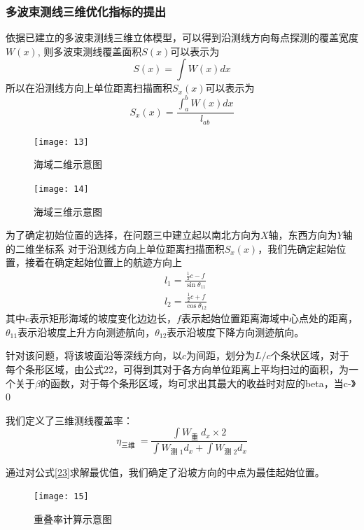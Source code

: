 \documentclass[11pt,twoside,a4paper]{article}
\begin{document}
\subsubsection{多波束测线三维优化指标的提出}
依据已建立的多波束测线三维立体模型，可以得到沿测线方向每点探测的覆盖宽度$W(x)$, 则多波束测线覆盖面积$S(x)$可以表示为
\begin{equation}
	S(x)=\int W(x) d x
\end{equation}
所以在沿测线方向上单位距离扫描面积$S_x(x)$可以表示为
\begin{equation}
	S_x(x)=\frac{\int_a^b W(x) d x}{l_{ab}}
\end{equation}
\begin{figure}[h]
	\centering
	\texttt{[image: 13]}
	\caption{海域二维示意图}
	
\end{figure}
\begin{figure}[h]
	\centering
	\texttt{[image: 14]}
	\caption{海域三维示意图}
	
\end{figure}
为了确定初始位置的选择，在问题三中建立起以南北方向为$X$轴，东西方向为$Y$轴的二维坐标系
对于沿测线方向上单位距离扫描面积$S_x(x)$，我们先确定起始位置，接着在确定起始位置上的航迹方向上
\begin{equation}
	\begin{aligned}
		& l_1=\frac{\frac{1}{2} c-f}{\sin \theta_{11}} \\
		& l_2=\frac{\frac{1}{2} c+f}{\cos \theta_{12}}
	\end{aligned}
 \label{23}
\end{equation}
其中$c$表示矩形海域的坡度变化边边长，$f$表示起始位置距离海域中心点处的距离，$\theta_{11}$表示沿坡度上升方向测迹航向，$\theta_{12}$表示沿坡度下降方向测迹航向。

针对该问题，将该坡面沿等深线方向，以$c$为间距，划分为$L/c$个条状区域，对于每个条形区域，由公式22，可得到其对于各方向单位距离上平均扫过的面积，为一个关于$\beta$的函数，对于每个条形区域，均可求出其最大的收益时对应的beta，当c-》0




我们定义了三维测线覆盖率：
\begin{equation}
	\eta_{\text {三维 }}=\frac{\int W_{\text {重 }} d_x \times 2}{\int W_{\text {测 } 1} d_x+\int W_{\text {测 } 2} d_x}
\end{equation}

通过对公式\ref{23}求解最优值，我们确定了沿坡方向的中点为最佳起始位置。


\begin{figure}[h]
	\centering
	\texttt{[image: 15]}
	\caption{重叠率计算示意图}
\end{figure}
\end{document}

